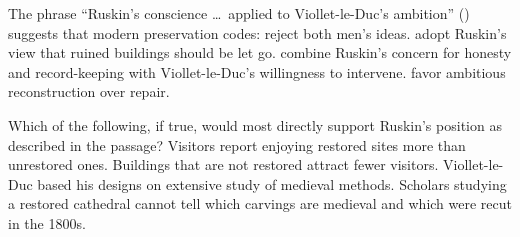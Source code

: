 \documentclass[11pt]{article}
\begin{document}
{The phrase ``Ruskin's conscience \dots\ applied to Viollet-le-Duc's ambition'' () suggests that modern preservation codes:}
{reject both men's ideas.}
{adopt Ruskin's view that ruined buildings should be let go.}
{combine Ruskin's concern for honesty and record-keeping with Viollet-le-Duc's willingness to intervene.}
{favor ambitious reconstruction over repair.}

{Which of the following, if true, would most directly support Ruskin's position as described in the passage?}
{Visitors report enjoying restored sites more than unrestored ones.}
{Buildings that are not restored attract fewer visitors.}
{Viollet-le-Duc based his designs on extensive study of medieval methods.}
{Scholars studying a restored cathedral cannot tell which carvings are medieval and which were recut in the 1800s.}
\end{document}
